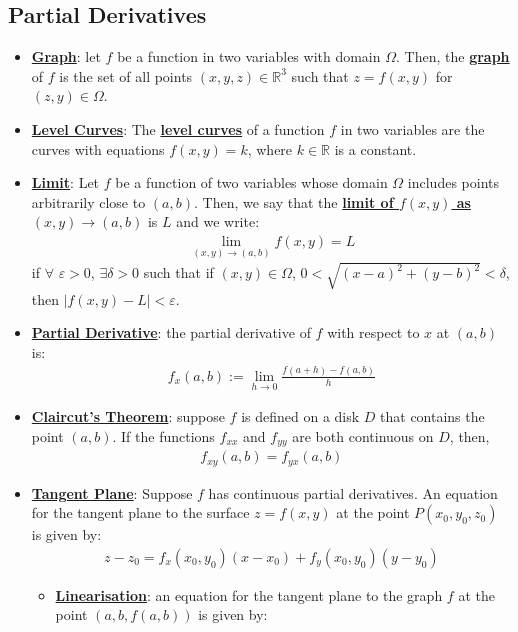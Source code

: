 \documentclass[11pt]{article}
\newcommand{\dfn}[1]{\underline{\textbf{#1}}}
\newcommand{\R}[0]{\mathbb{R}}
\begin{document}
\subsection{Partial Derivatives}
\begin{itemize}[noitemsep]
	\item \dfn{Graph}: let $f$ be a function in two variables with domain $\Omega$. Then, the \dfn{graph} of $f$ is the set of all points $(x,y,z) \in \R^3$ such that $z = f(x,y)$ for $(z,y) \in \Omega$. 
	\item \dfn{Level Curves}: The \dfn{level curves} of a function $f$ in two variables are the curves with equations $f(x,y) = k$, where $k \in \R$ is a constant.
	\item \dfn{Limit}: Let $f$ be a function of two variables whose domain $\Omega$ includes points arbitrarily close to $(a,b)$. Then, we say that the \dfn{limit of $f(x,y)$ as $(x,y) \rightarrow (a,b)$} is $L$ and we write:
	\begin{align}
		\lim_{(x,y) \rightarrow (a,b)} f(x,y) = L	
	\end{align}
 	if $\forall$ $\varepsilon > 0$, $\exists \delta > 0$ such that if $(x,y) \in \Omega$, $0 < \sqrt{(x-a)^2 + (y-b)^2} < \delta$, then $|f(x,y) - L | < \varepsilon$. 
 	\item \dfn{Partial Derivative}: the partial derivative of $f$ with respect to $x$ at $(a,b)$ is: 
 	\begin{align}
 		f_x(a,b) := \lim_{h \rightarrow 0} \frac{f(a+h) - f(a,b)}{h}	
 	\end{align}
	\item \dfn{Claircut's Theorem}: suppose $f$ is defined on a disk $D$ that contains the point $(a,b)$. If the functions $f_{xx}$ and $f_{yy}$ are both continuous on $D$, then, 
	\begin{align}
		f_{xy} (a,b) = f_{yx} (a,b) 	
	\end{align}
 	\item \dfn{Tangent Plane}: Suppose $f$ has continuous partial derivatives. An equation for the tangent plane to the surface $z = f(x,y)$ at the point $P(x_0, y_0, z_0) $ is given by: 
 	\begin{align}
 		z - z_0 = f_x (x_0, y_0) (x-x_0) + f_y (x_0, y_0) (y-y_0 ) 	
 	\end{align}
	\begin{itemize}[noitemsep]
		\item \dfn{Linearisation}: an equation for the tangent plane to the graph $f$ at the point $(a,b, f(a,b))$ is given by: 
		\begin{align}

\end{align}
\end{itemize}
\end{itemize}
\end{document}
